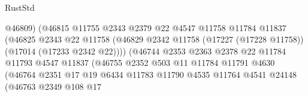 \begin{lexlean}{RustStd}
\begin{coremodule}
{\begin{coremodule}
{{{{{{{{{{{{{{{{{{{{{{{{{{{{{{{{{{{{{{{{{{{{{{{{{{{{{{{                                          @46809)
                                        (@46815
                                          @11755
                                          @2343
                                          @2379
                                          @22
                                          @4547
                                          @11758
                                          @11784
                                          @11837
                                          (@46825
                                            @2343
                                            @22
                                            @11758
                                            (@46829
                                              @2342
                                              @11758
                                              (@17227 (@17228 @11758))
                                              (@17014 (@17233 @2342 @22))))
                                          (@46744
                                            @2353
                                            @2363
                                            @2378
                                            @22
                                            @11784
                                            @11793
                                            @4547
                                            @11837
                                            (@46755
                                              @2352
                                              @503
                                              @11
                                              @11784
                                              @11791
                                              @4630
                                              (@46764
                                                @2351
                                                @17
                                                @19
                                                @6434
                                                @11783
                                                @11790
                                                @4535
                                                @11764
                                                @4541
                                                @24148
                                                (@46763
                                                  @2349
                                                  @108
                                                  @17
}}}}}}}}}}}}}}}}}}}}}}}}}}}}}}}}}}}}}}}}}}}}}}}}}}}}}}}
\end{coremodule}}
\end{coremodule}
\end{lexlean}
